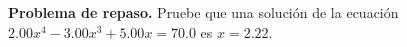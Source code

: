 \item \textbf{Problema de repaso.} Pruebe que una solución de la ecuación $2.00x^4 - 3.00x^3 + 5.00x = 70.0$ es $x = 2.22$.
